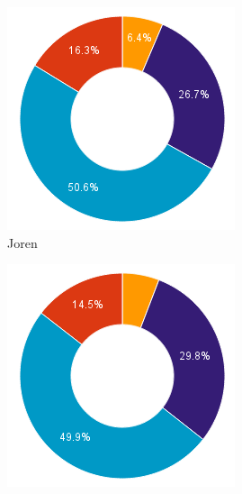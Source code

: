 \documentclass[i3]{oss}
\begin{document}
\begin{figure}[h!]
        \centering
        \begin{subfigure}[hb]{0.20\textwidth}
                \centering
                \includegraphics[width=\textwidth]{chart_2}
                \caption{Joren}
        \end{subfigure}%
        \begin{subfigure}[hb]{0.20\textwidth}
                \centering
                \includegraphics[width=\textwidth]{chart_3}

\end{subfigure}
\end{figure}
\end{document}
